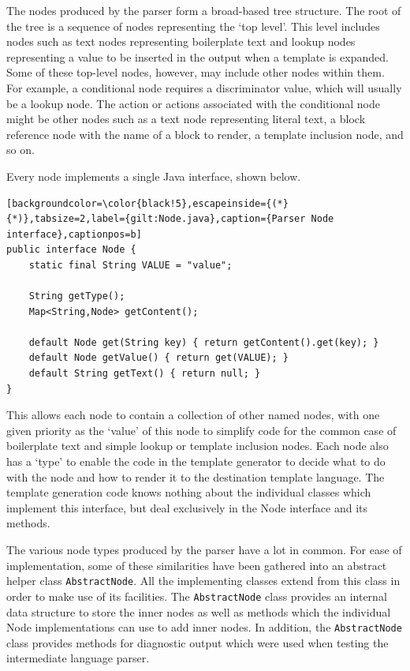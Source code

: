 The nodes produced by the parser form a broad-based tree structure. The root of the tree is a sequence of nodes representing the `top level'. This level includes nodes such as text nodes representing boilerplate text and lookup nodes representing a value to be inserted in the output when a template is expanded. Some of these top-level nodes, however, may include other nodes within them. For example, a conditional node requires a discriminator value, which will usually be a lookup node. The action or actions associated with the conditional node might be other nodes such as a text node representing literal text, a block reference node with the name of a block to render, a template inclusion node, and so on.

Every node implements a single Java interface, shown below.

\begin{lstlisting}[backgroundcolor=\color{black!5},escapeinside={(*}{*)},tabsize=2,label={gilt:Node.java},caption={Parser Node interface},captionpos=b]
public interface Node {
	static final String VALUE = "value";

	String getType();
	Map<String,Node> getContent();

	default Node get(String key) { return getContent().get(key); }
	default Node getValue() { return get(VALUE); }
	default String getText() { return null; }
}
\end{lstlisting}

This allows each node to contain a collection of other named nodes, with one given priority as the `value' of this node to simplify code for the common case of boilerplate text and simple lookup or template inclusion nodes. Each node also has a `type' to enable the code in the template generator to decide what to do with the node and how to render it to the destination template language. The template generation code knows nothing about the individual classes which implement this interface, but deal exclusively in the Node interface and its methods.

The various node types produced by the parser have a lot in common. For ease of implementation, some of these similarities have been gathered into an abstract helper class \verb!AbstractNode!. All the implementing classes extend from this class in order to make use of its facilities. The \verb!AbstractNode! class provides an internal data structure to store the inner nodes as well as methods which the individual Node implementations can use to add inner nodes. In addition, the \verb!AbstractNode! class provides methods for diagnostic output which were used when testing the intermediate language parser.

